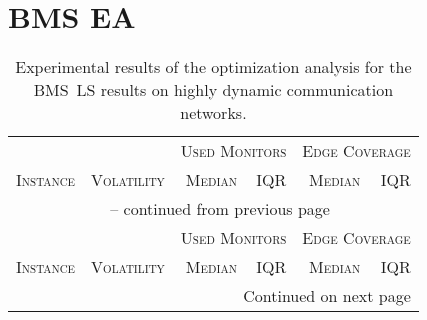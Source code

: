 \documentclass{scrartcl}
\begin{document}
\section{BMS EA}
\begin{center}
\begin{longtable}{lrrrrr}
    \caption{Experimental results of the optimization analysis for the BMS~LS results on highly dynamic communication networks.}\\
    \toprule
    & \textsc{} & \multicolumn{2}{c}{\textsc{Used Monitors}} & \multicolumn{2}{c}{\textsc{Edge Coverage}} \\
        \textsc{Instance} & \textsc{Volatility} & \textsc{Median} & \textsc{IQR} & \textsc{Median} & \textsc{IQR}\\
    \midrule
    \endfirsthead
    
    \multicolumn{6}{c}{\tablename~\thetable{} -- continued from previous page}\\
    & \textsc{} & \multicolumn{2}{c}{\textsc{Used Monitors}} & \multicolumn{2}{c}{\textsc{Edge Coverage}} \\
        \textsc{Instance} & \textsc{Volatility} & \textsc{Median} & \textsc{IQR} & \textsc{Median} & \textsc{IQR}\\
    \midrule
    \endhead
    
    \midrule
    \multicolumn{6}{r}{Continued on next page}
    \endfoot
    \bottomrule
    \endlastfoot
    

\end{longtable}
\end{center}
\end{document}
